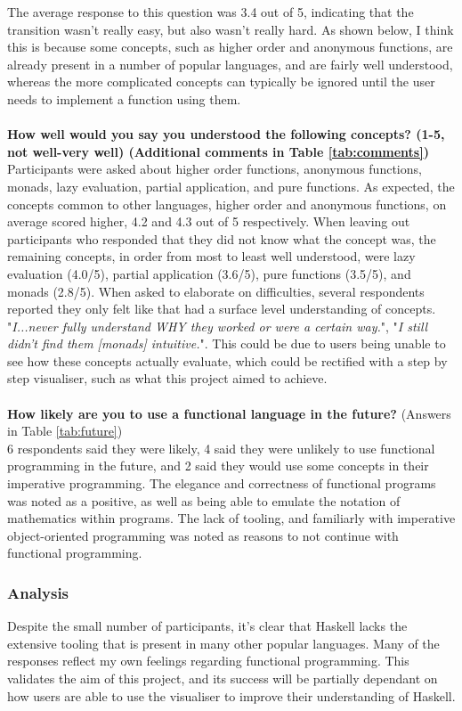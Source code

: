The average response to this question was 3.4 out of 5, indicating that the transition wasn't really easy, but also wasn't really hard. As shown below, I think this is because some concepts, such as higher order and anonymous functions, are already present in a number of popular languages, and are fairly well understood, whereas the more complicated concepts can typically be ignored until the user needs to implement a function using them.
\\\\\textbf{How well would you say you understood the following concepts? (1-5, not well-very well) (Additional comments in Table \ref{tab:comments})}\\
Participants were asked about higher order functions, anonymous functions, monads, lazy evaluation, partial application, and pure functions. As expected, the concepts common to other languages, higher order and anonymous functions, on average scored higher, 4.2 and 4.3 out of 5 respectively.
When leaving out participants who responded that they did not know what the concept was, the remaining concepts, in order from most to least well understood, were lazy evaluation (4.0/5), partial application (3.6/5), pure functions (3.5/5), and monads (2.8/5).
When asked to elaborate on difficulties, several respondents reported they only felt like that had a surface level understanding of concepts. "\textit{I...never fully understand WHY they worked or were a certain way.}", "\textit{I still didn’t find them [monads] intuitive.}". This could be due to users being unable to see how these concepts actually evaluate, which could be rectified with a step by step visualiser, such as what this project aimed to achieve.
\\\\\textbf{How likely are you to use a functional language in the future?} (Answers in Table \ref{tab:future})\\
6 respondents said they were likely, 4 said they were unlikely to use functional programming in the future, and 2 said they would use some concepts in their imperative programming.
The elegance and correctness of functional programs was noted as a positive, as well as being able to emulate the notation of mathematics within programs. The lack of tooling, and familiarly with imperative object-oriented programming was noted as reasons to not continue with functional programming.

\subsubsection{Analysis}
Despite the small number of participants, it's clear that Haskell lacks the extensive tooling that is present in many other popular languages. Many of the responses reflect my own feelings regarding functional programming. This validates the aim of this project, and its success will be partially dependant on how users are able to use the visualiser to improve their understanding of Haskell.